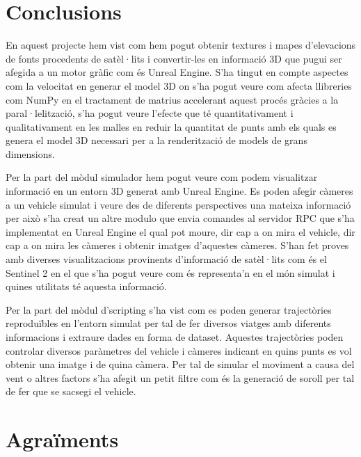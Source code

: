 \documentclass[10pt,a4paper,twocolumn,twoside]{article}
\begin{document}
\section{Conclusions}
En aquest projecte hem vist com hem pogut obtenir textures i mapes d'elevacions de fonts procedents de satèl·lits i convertir-les en informació 3D que pugui ser afegida a un motor gràfic com és Unreal Engine. S'ha tingut en compte aspectes com la velocitat en generar el model 3D on s'ha pogut veure com afecta llibreries com NumPy en el tractament de matrius accelerant aquest procés gràcies a la paral·lelització, s'ha pogut veure l'efecte que té quantitativament i qualitativament en les malles en reduir la quantitat de punts amb els quals es genera el model 3D necessari per a la renderització de models de grans dimensions.

Per la part del mòdul simulador hem pogut veure com podem visualitzar informació en un entorn 3D generat amb Unreal Engine. Es poden afegir càmeres a un vehicle simulat i veure des de diferents perspectives una mateixa informació per això s'ha creat un altre modulo que envia comandes al servidor RPC que s'ha implementat en Unreal Engine el qual pot moure, dir cap a on mira el vehicle, dir cap a on mira les càmeres i obtenir imatges d'aquestes càmeres.
S'han fet proves amb diverses visualitzacions provinents d'informació de satèl·lits com és el Sentinel 2 en el que s'ha pogut veure com és representa'n en el món simulat i quines utilitats té aquesta informació.

Per la part del mòdul d'scripting s'ha vist com es poden generar trajectòries reproduïbles en l'entorn simulat per tal de fer diversos viatges amb diferents informacions i extraure dades en forma de dataset. Aquestes trajectòries poden controlar diversos paràmetres del vehicle i càmeres indicant en quins punts es vol obtenir una imatge i de quina càmera. Per tal de simular el moviment a causa del vent o altres factors s'ha afegit un petit filtre com és la generació de soroll per tal de fer que se sacsegi el vehicle.


\section*{Agraïments}
\end{document}
